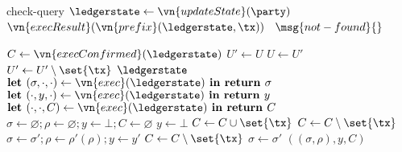 \begin{protocol}{\kachina}
  \begin{receive}{check-query}{\tx}
    \State \Let $\ledgerstate \gets \vn{updateState}(\party)$
    \If{$\tx \in \ledgerstate$}
      \Return $\vn{execResult}(\vn{prefix}(\ledgerstate, \tx))$
    \Else
      ~\Return $\msg{not-found}{}$
    \EndIf
  \end{receive}

  \begin{helpers}
      \State {}
      \State \Let $C \gets \vn{execConfirmed}(\ledgerstate)$
      \State \Let $U' \gets U$
      \Repeat
        \State \Let $U \gets U'$
            \State \Let $U' \gets U' \setminus \set{\tx}$
          \EndIf
        \EndFor
      \State \Return $\ledgerstate$
    \EndProcedure
      \State $\textbf{let }(\sigma, \cdot, \cdot) \gets \vn{exec}(\ledgerstate)
      \textbf{ in return } \sigma$
    \EndProcedure
      \State $\textbf{let }(\cdot, y, \cdot) \gets \vn{exec}(\ledgerstate)
      \textbf{ in return } y$
    \EndProcedure
      \State $\textbf{let }(\cdot, \cdot, C) \gets \vn{exec}(\ledgerstate)
      \textbf{ in return } C$
    \EndProcedure
      \State \Let $\sigma \gets \varnothing; \rho \gets \varnothing; y \gets
        \bot; C \gets \varnothing$
          \Continue
        \EndIf
        \State \Let $y \gets \bot$
          \Continue
        \EndIf
          \Continue
        \EndIf
        \State \Let $C \gets C \cup \set{\tx}$
              \State \Let $C \gets C \setminus \set{\tx}$
              \State \Break
            \EndIf
            \State \Let $\sigma \gets \sigma'; \rho \gets
              \rho'(\rho); y \gets y'$
          \EndFor
        \Else
              \State \Let $C \gets C \setminus \set{\tx}$
              \State \Break
            \EndIf
            \State \Let $\sigma \gets \sigma'$
          \EndFor
        \EndIf
      \EndFor
      \State \Return $((\sigma, \rho), y, C)$
    \EndProcedure
  \end{helpers}
\end{protocol}

